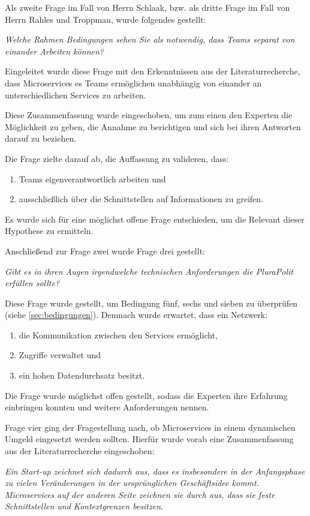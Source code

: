 Als zweite Frage im Fall von Herrn Schlaak, bzw. als dritte Frage im Fall von Herrn Rahles und Troppman, wurde folgendes gestellt:

\textit{Welche Rahmen Bedingungen sehen Sie als notwendig, dass Teams separat von einander Arbeiten können?}

Eingeleitet wurde diese Frage mit den Erkenntnissen aus der Literaturrecherche, dass Microservices es Teams ermöglichen unabhängig von einander an unterschiedlichen Services zu arbeiten.

Diese Zusammenfassung wurde eingeschoben, um zum einen den Experten die Möglichkeit zu geben, die Annahme zu berichtigen und sich bei ihren Antworten darauf zu beziehen.

Die Frage zielte darauf ab, die Auffassung zu valideren, dass:
\begin{enumerate}
	\item Teams eigenverantwortlich arbeiten und
	\item ausschließlich über die Schnittstellen auf Informationen zu greifen.
\end{enumerate}
Es wurde sich für eine möglichst offene Frage entschieden, um die Relevant dieser Hypothese zu ermitteln.

Anschließend zur Frage zwei wurde Frage drei gestellt:

\textit{Gibt es in ihren Augen irgendwelche technischen Anforderungen die PluraPolit erfüllen sollte? }

Diese Frage wurde gestellt, um Bedingung fünf, sechs und sieben zu überprüfen (siehe \cref{sec:bedingungen}). Demnach wurde erwartet, dass ein Netzwerk: 

\begin{enumerate}
	\item die Kommunikation zwischen den Services ermöglicht,
	\item Zugriffe verwaltet und
	\item ein hohen Datendurchsatz besitzt.
\end{enumerate}

Die Frage wurde möglichst offen gestellt, sodass die Experten ihre Erfahrung einbringen konnten und weitere Anforderungen nennen.

Frage vier ging der Fragestellung nach, ob Microservices in einem dynamischen Umgeld eingesetzt werden sollten. Hierfür wurde vorab eine Zusammenfassung aus der Literaturrecherche eingeschoben:

\textit{Ein Start-up zeichnet sich dadurch aus, dass es insbesondere in der Anfangsphase zu vielen Veränderungen in der ursprünglichen Geschäftsidee kommt. Microservices auf der anderen Seite zeichnen sie durch aus, dass sie feste Schnittstellen und Kontextgrenzen besitzen.}


